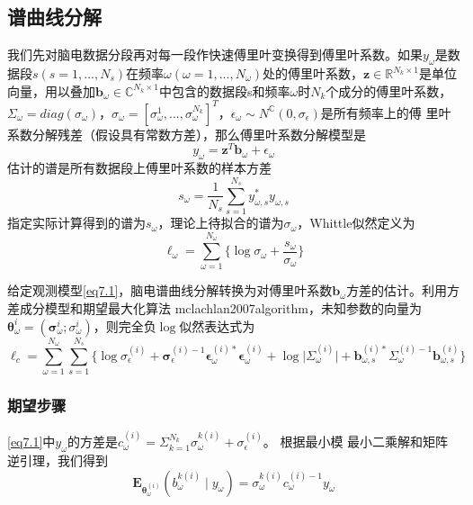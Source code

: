 \subsection{谱曲线分解}
我们先对脑电数据分段再对每一段作快速傅里叶变换得到傅里叶系数。如果$y_\omega$是数据段$s(s=1,...,N_s)$在频率$\omega(\omega=1,...,N_\omega)$处的傅里叶系数，$\mathbf{z}\in{\mathbb{R}^{N_k\times{1}}}$是单位向量，用以叠加$\mathbf{b}_\omega\in{\mathbb{C}^{N_k\times{1}}}$中包含的数据段s和频率$\omega$时$N_k$个成分的傅里叶系数，$\Sigma_\omega=diag(\sigma_\omega)$，$\sigma_\omega=[\sigma_\omega^1,...,\sigma_\omega^{N_k}]^T$，$\epsilon_\omega\sim{N^\mathbb{C}(0,\sigma_\epsilon)}$是所有频率上的傅
里叶系数分解残差（假设具有常数方差），那么傅里叶系数分解模型是
\begin{equation}\label{eq7.1}
y_\omega=\mathbf{z}^T\mathbf{b}_\omega+\epsilon_\omega
\end{equation}
估计的谱是所有数据段上傅里叶系数的样本方差
\begin{equation}\label{eq7.2}
s_\omega=\frac{1}{N_s}\sum_{s=1}^{N_s}y_{\omega,s}^*y_{\omega,s}
\end{equation}
指定实际计算得到的谱为$s_\omega$，理论上待拟合的谱为$\sigma_\omega$，Whittle似然定义为
\begin{equation}\label{eq7.3}
\ell_\omega=\sum_{\omega=1}^{N_\omega}\lbrace\log{\sigma_\omega}+\frac{s_\omega}{\sigma_\omega}\rbrace
\end{equation}

给定观测模型\eqref{eq7.1}，脑电谱曲线分解转换为对傅里叶系数$\mathbf{b}_\omega$方差的估计。利用方差成分模型和期望最大化算法\citing
{mclachlan2007algorithm}，未知参数的向量为$\mathbf{\theta}_\omega^{i}=(\mathbf{\sigma}_\omega^{i};\sigma_\omega^{i})$，则完全负$\log$似然表达式为
\begin{equation}\label{eq7.4}
\ell_c=\sum_{\omega=1}^{N_\omega}\sum_{s=1}^{N_s}\lbrace\log{\sigma}_\epsilon^{(i)}+\mathbf{\sigma}_\epsilon^{(i)-1}\mathbf{\epsilon}_\omega^{(i)*}\mathbf{\epsilon}_\omega^{(i)}+\log\lvert\Sigma_\omega^{(i)}\rvert+\mathbf{b}_{\omega,s}^{(i)*}\Sigma_\omega^{(i)-1}\mathbf{b}_{\omega,s}^{(i)}\rbrace
\end{equation}

\subsubsection{期望步骤}
\eqref{eq7.1}中$y_\omega$的方差是$c_\omega^{(i)}=\Sigma_{k=1}^{N_k}\sigma_\omega^{k(i)}+\sigma_\epsilon^{(i)}$。 根据最小模
最小二乘解和矩阵逆引理，我们得到
\begin{equation}\label{eq7.5}
\mathbf{E}_{\mathbf{\theta}_\omega^{(i)}}(b_\omega^{k(i)}\mid{y}_\omega)=\sigma_\omega^{k(i)}c_\omega^{(i)-1}y_\omega
\end{equation}

